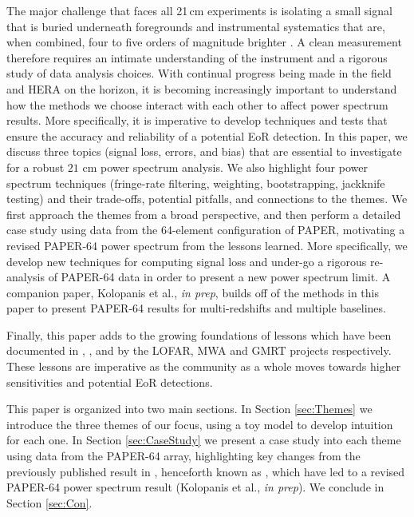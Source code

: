 \documentclass[preprint2,numberedappendix,tighten]{aastex6}  %
\begin{document}
The major challenge that faces all 21\,cm experiments is isolating a small signal that is buried underneath foregrounds and 
instrumental systematics that are, when combined, four to five orders of magnitude brighter \citep[e.g.,][]{santos_et_al2005, ali_et_al2008, deOliveiraCosta_et_al2008, jelic_et_al2008, bernardi_et_al2009, bernardi_et_al2010, ghosh_et_al2011, pober_et_al2013, bernardi_et_al2013, dillon_et_al2014, kohn_et_al2016}. A clean measurement therefore requires an intimate understanding of the instrument and a rigorous study of data analysis choices. With continual progress being made 
in the field and HERA on the horizon, it is becoming increasingly important to understand how the methods we choose interact 
with each other to affect power spectrum results. More specifically, it is imperative to develop techniques and tests that ensure 
the accuracy and reliability of a potential EoR detection. In this paper, we discuss three topics (signal loss, errors, and bias) that are essential to investigate 
for a robust $21$ cm power spectrum analysis. We also highlight four power spectrum techniques (fringe-rate filtering, weighting, bootstrapping, jackknife testing) and their trade-offs, potential 
pitfalls, and connections to the themes. We first approach the themes from a broad perspective, and then perform a detailed 
case study using data from the 64-element configuration of PAPER, motivating a revised PAPER-64 power spectrum 
from the lessons learned. More specifically, we develop new techniques for computing signal loss and under-go a rigorous re-analysis of PAPER-64 data in order to present a new power spectrum limit. A companion paper, Kolopanis et al., \textit{in prep}, builds off of the methods in this paper to present PAPER-64 results for multi-redshifts and multiple baselines.

Finally, this paper adds to the growing foundations of lessons which have been documented in  \citet{Patil2016}, \citet{Jacobs2016}, and \cite{Paciga2013} by the LOFAR, MWA and GMRT projects respectively. These lessons are imperative as the community as a whole moves towards higher sensitivities and potential EoR detections.

This paper is organized into two main sections. In Section \ref{sec:Themes} we introduce the three themes of our focus, using a 
toy model to develop intuition for each one. In Section \ref{sec:CaseStudy} we present a case study into each theme using data 
from the PAPER-64 array, highlighting key changes from the previously published result in \citet{ali_et_al2015}, henceforth known as , which have led to a 
revised PAPER-64 power spectrum result (Kolopanis et al., \textit{in prep}). We conclude in Section \ref{sec:Con}.
\end{document}
